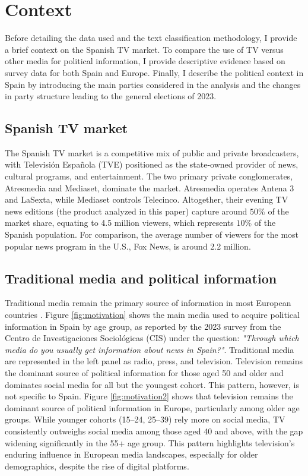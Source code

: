 \documentclass[12pt]{article}
\begin{document}
	
	
	\section{Context}
	
	Before detailing the data used and the text classification methodology, I provide a brief context on the Spanish TV market. To compare the use of TV versus other media for political information, I provide descriptive evidence based on survey data for both Spain and Europe. Finally, I describe the political context in Spain by introducing the main parties considered in the analysis and the changes in party structure leading to the general elections of 2023.
	
	\label{section:context}
	
	\subsection*{Spanish TV market}
	
	The Spanish TV market is a competitive mix of public and private broadcasters, with Televisión Española (TVE) positioned as the state-owned provider of news, cultural programs, and entertainment. The two primary private conglomerates, Atresmedia and Mediaset, dominate the market. Atresmedia operates Antena 3 and LaSexta, while Mediaset controls Telecinco. Altogether, their evening TV news editions (the product analyzed in this paper) capture around $50\%$ of the market share, equating to 4.5 million viewers, which represents $10\%$ of the Spanish population. For comparison, the average number of viewers for the most popular news program in the U.S., Fox News, is around 2.2 million.
	
	\subsection*{Traditional media and political information}
	
	Traditional media remain the primary source of information in most European countries \citep{europarl2024}. Figure \ref{fig:motivation} shows the main media used to acquire political information in Spain by age group, as reported by the 2023 survey from the Centro de Investigaciones Sociológicas (CIS) under the question: \textit{"Through which media do you usually get information about news in Spain?"}. Traditional media are represented in the left panel as radio, press, and television. Television remains the dominant source of political information for those aged 50 and older and dominates social media for all but the youngest cohort. This pattern, however, is not specific to Spain. Figure \ref{fig:motivation2} shows that television remains the dominant source of political information in Europe, particularly among older age groups. While younger cohorts (15--24, 25--39) rely more on social media, TV consistently outweighs social media among those aged 40 and above, with the gap widening significantly in the 55+ age group. This pattern highlights television’s enduring influence in European media landscapes, especially for older demographics, despite the rise of digital platforms.
	
\end{document}
